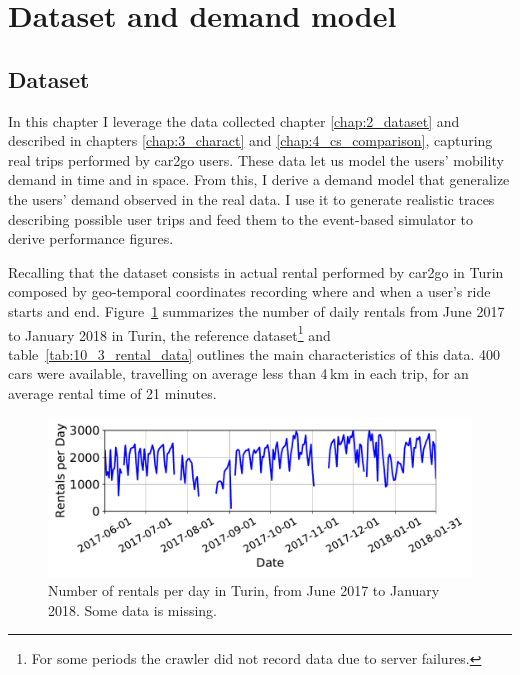 \section{Dataset and demand model}
\label{sec:10_3_dataset}

\subsection{Dataset}
In this chapter I leverage the data collected chapter \ref{chap:2_dataset} and described in chapters \ref{chap:3_charact} and \ref{chap:4_cs_comparison}, capturing real trips performed by car2go users. These data let us model the users' mobility demand in time and in space. From this, I derive a demand model that generalize the users' demand observed in the real data. I use it to generate realistic traces describing possible user trips and feed them to the event-based simulator to derive performance figures. 

Recalling that the dataset consists in actual rental performed by car2go in Turin composed by geo-temporal coordinates recording where and when a user's ride starts and end. Figure~\ref{fig:10_3_rentals_per_day} summarizes the number of daily rentals from June 2017 to January 2018 in Turin, the reference dataset\footnote{For some periods the crawler did not record data due to server failures.} and table~\ref{tab:10_3_rental_data} outlines the main characteristics of this data. 400 cars were available, travelling on average less than 4\,km in each trip, for an average rental time of 21 minutes.


\begin{figure}
    \begin{center}
            \includegraphics[width=\columnwidth]{fig/RentalsDay.pdf}
            \caption{Number of rentals per day in Turin, from June 2017 to January 2018. Some data is missing.}
            \label{fig:10_3_rentals_per_day}
            \end{center}
\end{figure}


